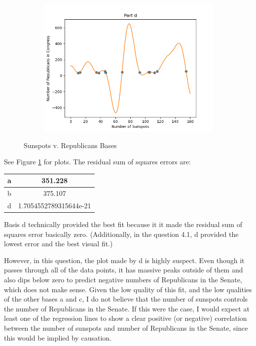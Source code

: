 \documentclass[submit]{harvardml}
\begin{document}
\begin{enumerate}
\begin{figure}[h]
\begin{subfigure}[b]{0.475\textwidth}
			\includegraphics[width=\textwidth]{d_sunspots}
		\end{subfigure}
		\caption{Sunspots v. Republicans Bases}
		\label{fig:4.2}
	\end{figure}

	See Figure \ref{fig:4.2} for plots. The residual sum of squares errors are:

	\begin{center}
		\begin{tabular}{|c|c|}
			\hline
			a & 351.228 \\ \hline
			b & 375.107 \\ \hline
			d & 1.7054552789315644e-21 \\ \hline
		\end{tabular}
	\end{center}
	
	Basis d technically provided the best fit because it it made the residual sum of squares error basically zero. (Additionally, in the question 4.1, d provided the lowest error and the best visual fit.)
	
	However, in this question, the plot made by d is highly suspect. Even though it passes through all of the data points, it has massive peaks outside of them and also dips below zero to predict negative numbers of Republicans in the Senate, which does not make sense. Given the low quality of this fit, and the low qualities of the other bases a and c, I do not believe that the number of sunspots controls the number of Republicans in the Senate. If this were the case, I would expect at least one of the regression lines to show a clear positive (or negative) correlation between the number of sunspots and number of Republicans in the Senate, since this would be implied by causation.	

\end{enumerate}
\end{document}
